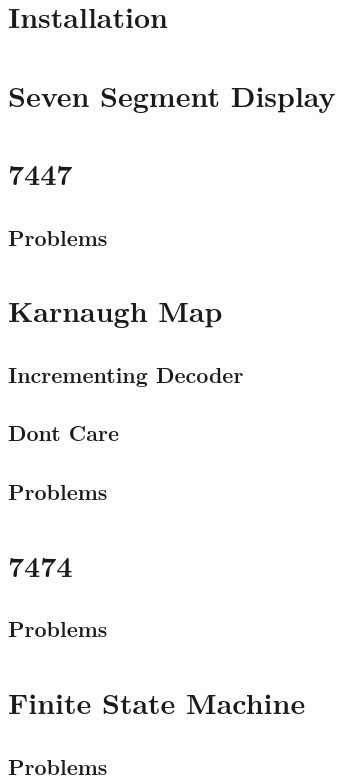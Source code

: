 \documentclass[journal]{IEEEtran}
\begin{document}
\section{Installation}

\newpage
\section{Seven Segment Display}

\newpage
\section{7447}

\subsection{Problems}


\newpage
\section{Karnaugh Map}
\subsection{ Incrementing Decoder}

\subsection{Dont Care}

\subsection{Problems}

\newpage
\section{7474}

\subsection{Problems}

\newpage
\section{Finite State Machine}

\subsection{Problems}

\newpage
\end{document}
